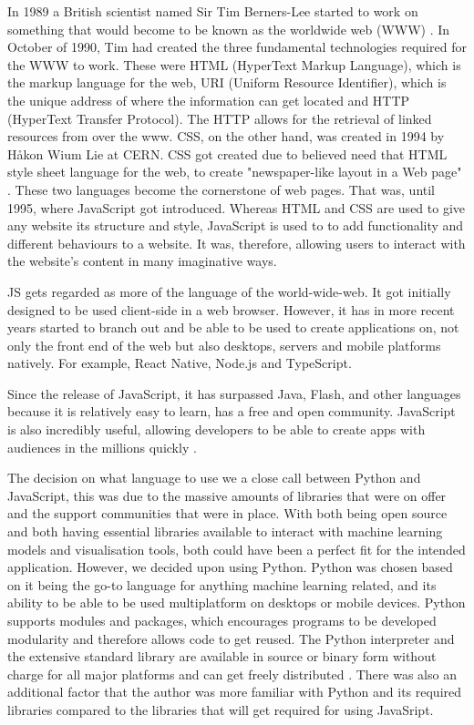 	In 1989 a British scientist named Sir Tim Berners-Lee started to work on something that would become to be known as the worldwide web (WWW) \cite{web_foundation}. In October of 1990, Tim had created the three fundamental technologies required for the WWW to work\cite{web_foundation}. These were HTML (HyperText Markup Language), which is the markup language for the web, URI (Uniform Resource Identifier), which is the unique address of where the information can get located and HTTP (HyperText Transfer Protocol). The HTTP allows for the retrieval of linked resources from over the www. CSS, on the other hand, was created in 1994 by Håkon Wium Lie at CERN. CSS got created due to believed need that HTML style sheet language for the web, to create "newspaper-like layout in a Web page" \cite{css_history}. These two languages become the cornerstone of web pages. That was, until 1995, where JavaScript got introduced. Whereas HTML and CSS are used to give any website its structure and style, JavaScript is used to to add functionality and different behaviours to a website. It was, therefore, allowing users to interact with the website's content in many imaginative ways.
	
	JS gets regarded as more of the language of the world-wide-web. It got initially designed to be used client-side in a web browser. However, it has in more recent years started to branch out and be able to be used to create applications on, not only the front end of the web but also desktops, servers and mobile platforms natively. For example, React Native, Node.js and TypeScript.
	
	Since the release of JavaScript, it has surpassed Java, Flash, and other languages because it is relatively easy to learn, has a free and open community. JavaScript is also incredibly useful, allowing developers to be able to create apps with audiences in the millions quickly \cite{js_springboard}.
	
	The decision on what language to use we a close call between Python and JavaScript, this was due to the massive amounts of libraries that were on offer and the support communities that were in place. With both being open source and both having essential libraries available to interact with machine learning models and visualisation tools, both could have been a perfect fit for the intended application. However, we decided upon using Python. Python was chosen based on it being the go-to language for anything machine learning related, and its ability to be able to be used multiplatform on desktops or mobile devices. Python supports modules and packages, which encourages programs to be developed modularity and therefore allows code to get reused. The Python interpreter and the extensive standard library are available in source or binary form without charge for all major platforms and can get freely distributed \cite{python_desc}. There was also an additional factor that the author was more familiar with Python and its required libraries compared to the libraries that will get required for using JavaSript.

